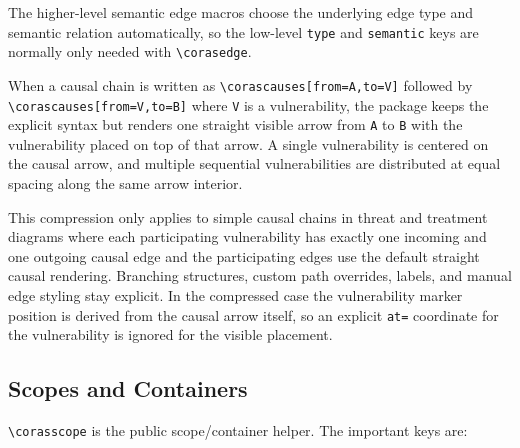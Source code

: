 \documentclass[a4paper]{article}
\begin{document}
The higher-level semantic edge macros choose the underlying edge type and
semantic relation automatically, so the low-level \texttt{type} and
\texttt{semantic} keys are normally only needed with
\texttt{\textbackslash corasedge}.

When a causal chain is written as
\texttt{\textbackslash corascauses[from=A,to=V]} followed by
\texttt{\textbackslash corascauses[from=V,to=B]} where \texttt{V} is a
vulnerability, the package keeps the explicit syntax but renders one straight
visible arrow from \texttt{A} to \texttt{B} with the vulnerability placed on
top of that arrow. A single vulnerability is centered on the causal arrow, and
multiple sequential vulnerabilities are distributed at equal spacing along the
same arrow interior.

This compression only applies to simple causal chains in threat and treatment
diagrams where each participating vulnerability has exactly one incoming and
one outgoing causal edge and the participating edges use the default straight
causal rendering. Branching structures, custom path overrides, labels, and
manual edge styling stay explicit. In the compressed case the vulnerability
marker position is derived from the causal arrow itself, so an explicit
\texttt{at=} coordinate for the vulnerability is ignored for the visible
placement.

\subsection{Scopes and Containers}

\texttt{\textbackslash corasscope} is the public scope/container helper. The
important keys are:
\end{document}
